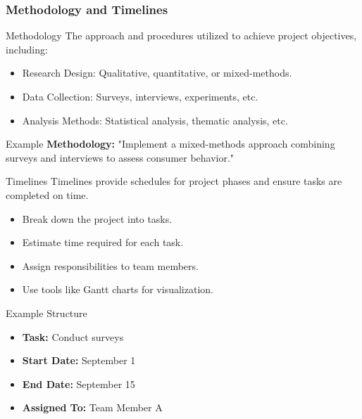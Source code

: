 \documentclass[aspectratio=169]{beamer}
\begin{document}
\begin{frame}[fragile]
    \frametitle{Methodology and Timelines}
    \begin{block}{Methodology}
        The approach and procedures utilized to achieve project objectives, including:
    \end{block}
    
    \begin{itemize}
        \item Research Design: Qualitative, quantitative, or mixed-methods.
        \item Data Collection: Surveys, interviews, experiments, etc.
        \item Analysis Methods: Statistical analysis, thematic analysis, etc.
    \end{itemize}

    \begin{block}{Example}
        \textbf{Methodology:} "Implement a mixed-methods approach combining surveys and interviews to assess consumer behavior."
    \end{block}

    \begin{block}{Timelines}
        Timelines provide schedules for project phases and ensure tasks are completed on time.
    \end{block}

    \begin{itemize}
        \item Break down the project into tasks.
        \item Estimate time required for each task.
        \item Assign responsibilities to team members.
        \item Use tools like Gantt charts for visualization.
    \end{itemize}

    \begin{block}{Example Structure}
        \begin{itemize}
            \item \textbf{Task:} Conduct surveys
            \item \textbf{Start Date:} September 1
            \item \textbf{End Date:} September 15
            \item \textbf{Assigned To:} Team Member A
        \end{itemize}
    \end{block}
\end{frame}
\end{document}
